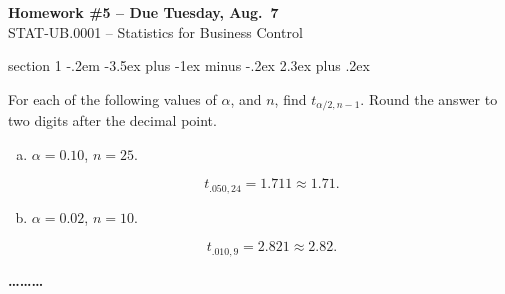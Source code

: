 \documentclass[answers,11pt]{exam}
\makeatletter
\newenvironment{problem}{\@startsection
       {section}
       {1}
       {-.2em}
       {-3.5ex plus -1ex minus -.2ex}
       {2.3ex plus .2ex}
       {\pagebreak[3]%
       \large\bf\noindent{Problem }
       }
       }
       {%
       \begin{center}\large\bf \ldots\ldots\ldots\end{center}}
\makeatother
\begin{document}
\begin{center}
  \large
  \textbf{Homework \#5 -- Due Tuesday, Aug.~7} \\
  STAT-UB.0001 -- Statistics for Business Control \\
\end{center}


\thispagestyle{empty}

\begin{problem}{}

For each of the following values of $\alpha$, and $n$, find $t_{\alpha/2,n-1}$. 
Round the answer to two digits after the decimal point.

\begin{enumerate}[(a)]

\item $\alpha = 0.10$, $n = 25$.
    \begin{solution}
        \[
            t_{.050,24} = 1.711 \approx 1.71.
        \]
    \end{solution}


\item $\alpha = 0.02$, $n = 10$.
    \begin{solution}
        \[
            t_{.010,9} = 2.821 \approx 2.82.
        \]
    \end{solution}


\end{enumerate}

\end{problem}
\end{document}
